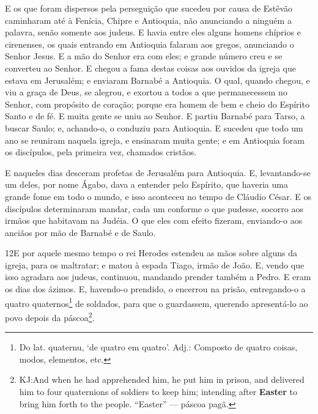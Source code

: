 E os que foram dispersos pela perseguição que sucedeu por causa
de Estêvão caminharam até à Fenícia, Chipre e Antioquia, não
anunciando a ninguém a palavra, senão somente aos judeus. E
havia entre eles alguns homens chíprios e cirenenses, os quais
entrando em Antioquia falaram aos gregos, anunciando o Senhor Jesus.
E a mão do Senhor era com eles; e grande número creu e se
converteu ao Senhor. E chegou a fama destas coisas aos
ouvidos da igreja que estava em Jerusalém; e enviaram Barnabé a
Antioquia. O qual, quando chegou, e viu a graça de Deus, se
alegrou, e exortou a todos a que permanecessem no Senhor, com
propósito de coração; porque era homem de bem e cheio do
Espírito Santo e de fé. E muita gente se uniu ao Senhor. E
partiu Barnabé para Tarso, a buscar Saulo; e, achando-o, o conduziu
para Antioquia. E sucedeu que todo um ano se reuniram naquela
igreja, e ensinaram muita gente; e em Antioquia foram os discípulos,
pela primeira vez, chamados cristãos.

E naqueles dias desceram profetas de Jerusalém para Antioquia.
E, levantando-se um deles, por nome Ágabo, dava a entender
pelo Espírito, que haveria uma grande fome em todo o mundo, e isso
aconteceu no tempo de Cláudio César. E os discípulos
determinaram mandar, cada um conforme o que pudesse, socorro aos
irmãos que habitavam na Judéia. O que eles com efeito
fizeram, enviando-o aos anciãos por mão de Barnabé e de Saulo.

\medskip

\lettrine{12} E por aquele mesmo tempo o rei Herodes estendeu
as mãos sobre alguns da igreja, para os maltratar; e matou à
espada Tiago, irmão de João. E, vendo que isso agradara aos
judeus, continuou, mandando prender também a Pedro. E eram os dias
dos ázimos. E, havendo-o prendido, o encerrou na prisão,
entregando-o a quatro quaternos\footnote{Do lat. quaternu, `de
quatro em quatro'. Adj.: Composto de quatro coisas, modos,
elementos, etc.} de soldados, para que o guardassem, querendo
apresentá-lo ao povo depois da páscoa\footnote{KJ:And when he had
apprehended him, he put him in prison, and delivered him to four
quaternions of soldiers to keep him; intending after \textbf{Easter}
to bring him forth to the people. ``Easter'' --- páscoa pagã.}.

